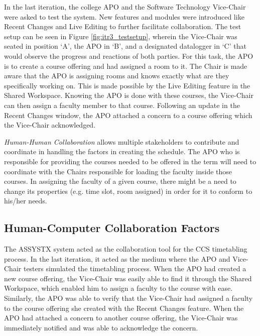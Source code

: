 In the last iteration, the college APO and the Software Technology Vice-Chair were asked to test the system. New features and modules were introduced like Recent Changes and Live Editing to further facilitate collaboration. The test setup can be seen in Figure \ref{fig:itr3_testsetup}, wherein the Vice-Chair was seated in position `A', the APO in `B', and a designated datalogger in `C' that would observe the progress and reactions of both parties. For this task, the APO is to create a course offering and had assigned a room to it. The Chair is made aware that the APO is assigning rooms and knows exactly what are they specifically working on. This is made possible by the Live Editing feature in the Shared Workspace. Knowing the APO is done with these courses, the Vice-Chair can then assign a faculty member to that course. Following an update in the Recent Changes window, the APO attached a concern to a course offering which the Vice-Chair acknowledged.




\textit{Human-Human Collaboration} allows multiple stakeholders to contribute and coordinate in handling the factors in creating the schedule. The APO who is responsible for providing the courses needed to be offered in the term will need to coordinate with the Chairs responsible for loading the faculty inside those courses. In assigning the faculty of a given course, there might be a need to change its properties (e.g. time slot, room assigned) in order for it to conform to his/her needs.


\subsection{Human-Computer Collaboration Factors}
The ASSYSTX system acted as the collaboration tool for the CCS timetabling process. In the last iteration, it acted as the medium where the APO and Vice-Chair testers simulated the timetabling process. When the APO had created a new course offering, the Vice-Chair was easily able to find it through the Shared Workspace, which enabled him to assign a faculty to the course with ease. Similarly, the APO was able to verify that the Vice-Chair had assigned a faculty to the course offering she created with the Recent Changes feature. When the APO had attached a concern to another course offering, the Vice-Chair was immediately notified and was able to acknowledge the concern. 

